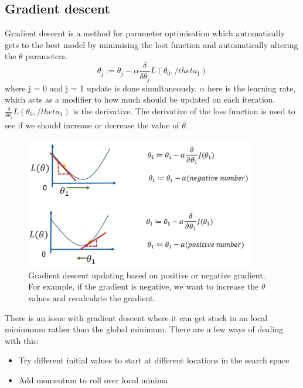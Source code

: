 \documentclass[CS5104-Notes.tex]{subfiles}
\begin{document}
\subsection{Gradient descent}
Gradient descent is a method for parameter optimisation which automatically gets to the best model by minimising the lost function and automatically altering the $\theta$ parameters.
\begin{equation}
  \theta_{j} := \theta_{j} - \alpha \frac{\delta}{\delta \theta_{j}} L(\theta_{0}, /theta_{1})
\end{equation}
where j = 0 and j = 1 update is done simultaneously. $\alpha$ here is the learning rate, which acts as a modifier to how much should be updated on each iteration. $\frac{\delta}{\delta \theta_{j}} L(\theta_{0}, /theta_{1})$ is the derivative. The derivative of the loss function is used to see if we should increase or decrease the value of $\theta$.
\begin{figure}
  \centering
  \includegraphics[width=0.9\textwidth, keepaspectratio]{imgs/gradient-descent.png}
  \caption{Gradient descent updating based on positive or negative gradient. For example, if the gradient is negative, we want to increase the $\theta$ values and recalculate the gradient.}
\end{figure}
There is an issue with gradient descent where it can get stuck in an local minimumm rather than the global minimum. There are a few ways of dealing with this:
\begin{itemize}
\item Try different initial values to start at different locations in the search space
\item Add momentum to roll over local minima
\end{itemize}
\end{document}
